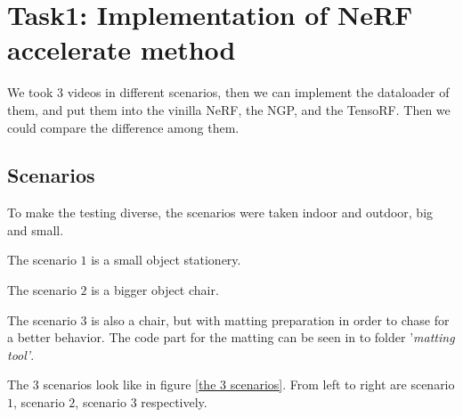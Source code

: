\section{Task1: Implementation of NeRF accelerate method}
\label{sec:intro}

We took $3$ videos in different scenarios, then we can implement the dataloader of them, and put them into the vinilla NeRF, the NGP, and the TensoRF. Then we could compare the difference among them.

\subsection{Scenarios}
\label{scenarios}

To make the testing diverse, the scenarios were taken indoor and outdoor, big and small.

The scenario $1$ is a small object stationery.

The scenario $2$ is a bigger object chair.

The scenario $3$ is also a chair, but with matting preparation in order to chase for a better behavior. The code part for the matting can be seen in to folder '\textit{matting tool'}. 

The $3$ scenarios look like in figure \ref{the 3 scenarios}. From left to right are scenario $1$, scenario $2$, scenario $3$ respectively.

